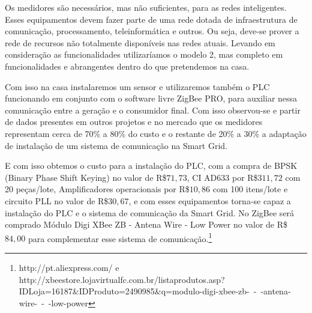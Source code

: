 	Os medidores são necessários, mas não suficientes, para as redes inteligentes. Esses equipamentos devem fazer parte de uma rede dotada de infraestrutura de comunicação, processamento, teleinformática e outros. Ou seja, deve-se prover a rede de recursos não totalmente disponíveis nas redes atuais. Levando em consideração as funcionalidades utilizaríamos o modelo 2, mas completo em funcionalidades e abrangentes dentro do que pretendemos na casa.

	Com isso na casa instalaremos um sensor e utilizaremos também o PLC funcionando em conjunto com o software livre ZigBee PRO, para auxiliar nessa comunicação entre a geração e o consumidor final. Com isso observou-se e partir de dados presentes em outros projetos e no mercado que os medidores representam cerca de 70\% a 80\% do custo e o restante de 20\% a 30\% a adaptação de instalação de um sistema de comunicação na Smart Grid.

	E com isso obtemos o custo para a instalação do PLC, com a compra de BPSK (Binary Phase Shift Keying) no valor de R\$$ 71,73$, CI AD633 por R\$$ 311,72$ com 20 peças/lote, Amplificadores operacionais por R\$$ 10,86$ com 100 itens/lote e circuito PLL no valor de R\$$ 30,67$, e com esses equipamentos torna-se capaz a instalação do PLC e o sistema de comunicação da Smart Grid. No ZigBee será comprado Módulo Digi XBee ZB - Antena Wire - Low Power no valor de R\$$ 84,00$ para complementar esse sistema de comunicação.\footnote{http://pt.aliexpress.com/ e http://xbeestore.lojavirtualfc.com.br/listaprodutos.asp?IDLoja=16187\&IDProduto=2490985\&q=modulo-digi-xbee-zb-~-~-antena-wire-~-~-low-power}
	
	
	


